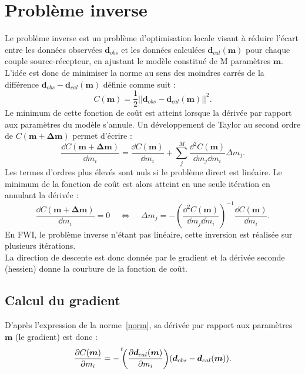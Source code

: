 \section{Problème inverse}

Le problème inverse est un problème d'optimisation locale visant à réduire l'écart entre les données observées $\bm{d}_{obs}$ et les données calculées $\bm{d}_{cal}(\bm{m})$ pour chaque couple source-récepteur, en ajustant le modèle constitué de M paramètres $\bm{m}$. L'idée est donc de minimiser la norme au sens des moindres carrés de la différence $\bm{d}_{obs}-\bm{d}_{cal}(\bm{m})$ définie comme suit : 
\begin{equation}
	C(\bm{m})=\frac{1}{2}||\bm{d}_{obs}-\bm{d}_{cal}(\bm{m})||^{2}\text{.}
	\label{norm}
\end{equation}
 Le minimum de cette fonction de coût est atteint lorsque la dérivée par rapport aux paramètres du modèle s'annule. Un développement de Taylor au second ordre de $C(\bm{m}+ \bm{\Delta m})$ permet d'écrire : 
 \begin{equation}
 	\frac{\dd C(\bm{m}+\bm{\Delta m})}{\dd m_{i}}= \frac{\dd C(\bm{m})}{\dd m_{i}} + \displaystyle\sum_{j}^{M} \frac{\dd^{2} C(\bm{m})}{\dd m_{j} \dd m_{i}}\Delta m_{j}\text{.}
 \end{equation}
Les termes d'ordres plus élevés sont nuls si le problème direct est linéaire. Le minimum de la fonction de coût est alors atteint en une seule itération en annulant la dérivée : 
\begin{equation}
	\frac{\dd C(\bm{m}+\bm{\Delta m})}{\dd m_{i}} = 0 ~~~~~\Leftrightarrow ~~~~~ \Delta m _{j} = -\left( \frac{\dd ^{2} C(\bm{m})}{\dd m_{j} \dd m_{i} }\right)^{-1} \frac{\dd C (\bm{m})}{\dd m_{i}} \text{.}
\end{equation}
En FWI, le problème inverse n'étant pas linéaire, cette inversion est réalisée sur plusieurs itérations.\\
La direction de descente est donc donnée par le gradient et la dérivée seconde (hessien) donne la courbure de la fonction de coût.\\



\subsection{Calcul du gradient}

D'après l'expression de la norme~\ref{norm}, sa dérivée par rapport aux paramètres $\bm{m}$ (le gradient) est donc : 
\begin{equation}
	 \frac{\dd C (\bm{m})}{\dd m_{i}} = -\tr{\left( \frac{\dd \bm{d}_{cal}(\bm{m}) }{\dd m_{i}} \right)} ( \bm{d}_{obs} - \bm{d}_{cal}(\bm{m})) \text{.}
	 \label{eq_grad}
\end{equation}\\



